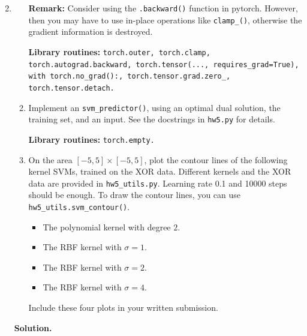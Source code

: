 \documentclass{article}
\theoremstyle{definition}
\theoremstyle{remark}
\newenvironment{Q}
{%
\clearpage
\item
}
{%
\phantom{s}%
\bigskip%
\noindent\textbf{Solution.}
}
\begin{document}
\begin{enumerate}[font={\Large\bfseries},left=0pt]
\begin{Q}
\begin{enumerate}
    \textbf{Remark:} Consider using the \texttt{.backward()} function in pytorch. However, then you may have to use in-place operations like \texttt{clamp\_()}, otherwise the gradient information is destroyed.
    
    \textbf{Library routines:} \texttt{torch.outer, torch.clamp, torch.autograd.backward, torch.tensor(..., requires\_grad=True), with torch.no\_grad():, torch.tensor.grad.zero\_, torch.tensor.detach.}

        \item Implement an \texttt{svm\_predictor()}, using an optimal dual solution, the training set, and an input. See the docstrings in \texttt{hw5.py} for details.
        
        \textbf{Library routines:} \texttt{torch.empty.}

        \item On the area $[-5,5]\times[-5,5]$, plot the contour lines of the following kernel SVMs, trained on the XOR data. Different kernels and the XOR data are provided in \texttt{hw5\_utils.py}. Learning rate 0.1 and 10000 steps should be enough. To draw the contour lines, you can use \texttt{hw5\_utils.svm\_contour()}.
        \begin{itemize}
            \item The polynomial kernel with degree $2$.
            \item The RBF kernel with $\sigma=1$.
            \item The RBF kernel with $\sigma=2$.
            \item The RBF kernel with $\sigma=4$.
        \end{itemize}
        Include these four plots in your written submission.
    \end{enumerate}
\end{Q}
\end{enumerate}
\end{document}

